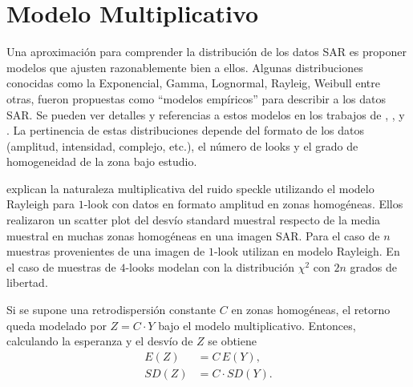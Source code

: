 \section{Modelo Multiplicativo}
\label{ModeloMultiplicativo}

Una aproximación para comprender la distribución de los datos SAR es proponer modelos que ajusten razonablemente bien a ellos. Algunas distribuciones conocidas como la Exponencial, Gamma, Lognormal, Rayleig, Weibull entre otras, fueron propuestas como ``modelos empíricos'' para describir a los datos SAR. 
Se pueden ver detalles y referencias a estos modelos en los trabajos de \citet{FreryLibro2019}, \citet{oliverquegan98}, \citet{Yanasse93} y \citet{Lee2009}. 
La pertinencia de estas distribuciones depende del formato de los datos (amplitud, intensidad, complejo, etc.), el número de looks y el grado de homogeneidad de la zona bajo estudio.

%


 \citet{Lee2009} explican la naturaleza multiplicativa del ruido speckle utilizando el modelo Rayleigh para $1$-look con datos en formato amplitud en zonas homogéneas. Ellos realizaron un scatter plot del desvío standard muestral respecto de la media muestral en muchas zonas homogéneas en una imagen SAR. Para el caso de $n$ muestras provenientes de una imagen de $1$-look utilizan en modelo Rayleigh. En el caso de muestras de $4$-looks modelan con la distribución $\chi^2$ con $2n$ grados de libertad.

Si se supone una retrodispersión constante $C$ en zonas homogéneas, el retorno queda modelado por $Z=C \cdot Y$ bajo el modelo multiplicativo. Entonces, calculando la esperanza y el desvío de $Z$ se obtiene
\begin{align}
E(Z)&=C \, E(Y),\label{esperanza}\\
SD(Z)&=C \cdot SD(Y).\label{desvio}
\end{align} 

